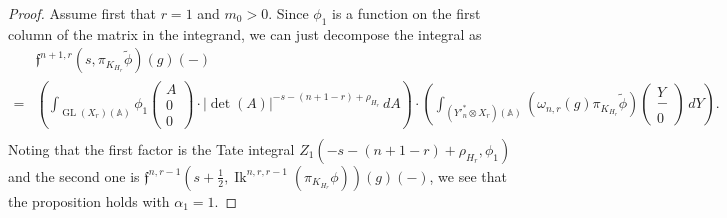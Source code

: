 \documentclass[10pt]{amsart}
\theoremstyle{plain}
\numberwithin{equation}{section}
\begin{document}
\begin{proof}
Assume first that $r=1$ and $m_0>0$. Since $\phi_1$ is a function on the first column of the matrix in the integrand, we can just
decompose the integral as
\begin{align*}
&  \mathfrak{f}^{n+1,r}(s, \pi_{K_{H_r}} \tilde{\phi})(g)(-)\\
=&\left(\int _{{\operatorname{GL}}(X_r)({\mathbb{A}})}\phi_1\begin{pmatrix}A\\0\\0\end{pmatrix}
\cdot |\det(A)|^{-s - (n+1-r) + \rho_{H_r}}
\,dA\right)
\cdot\left(\int_{({Y'}_{n}^* \otimes X_r)({\mathbb{A}})} 
(\omega_{n,r}(g) \pi_{K_{H_r}}\tilde{\phi})\begin{pmatrix}
Y  \\
- \\
0
 \end{pmatrix}    
  \, dY\right).\\
\end{align*}
Noting that the first factor is the Tate integral $Z_1( -s  - (n+1-r) +
\rho_{H_r}, \phi_1)$ and the second one is $\mathfrak{f}^{n, r-1} (s + \frac{1}{2},  
{\operatorname{Ik}}^{n,r,r-1}(\pi_{K_{H_r}}\phi))(g)(-)$, we see that the proposition holds with $\alpha_1=1$.
\vskip 5pt


\end{proof}
\end{document}
